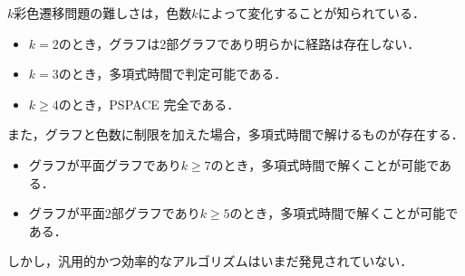 \begin{comment}
  
\begin{figure}[tb]
  \centering
  \begin{subfigure}{0.4\hsize}
    \centering
    
    \caption{$t=0$ (初期状態)}
   \end{subfigure}
   \hspace{1cm}
   \begin{subfigure}{0.4\hsize}
    \centering
    
    \caption{$t=1$}
   \end{subfigure}
   \\
   \vspace{0.5cm}
   \begin{subfigure}{0.4\hsize}
    \centering
    
    \caption{$t=2$}
   \end{subfigure}
   \hspace{1cm}
   \begin{subfigure}{0.4\hsize}
    \centering
    
    \caption{$t=3$ (目標状態)}
   \end{subfigure}

   \caption{遷移系列の例}
   \label{fig:ans_varrecol}
\end{figure}
\end{comment}

$k$彩色遷移問題の難しさは，色数$k$によって変化することが知られている． 
\begin{itemize}
  \item $k = 2$のとき，グラフは2部グラフであり明らかに経路は存在しない． \cite{CHM2011:JGT}
  \item $k = 3$のとき，多項式時間で判定可能である． \cite{CHM2011:JGT}
  \item $k \geq 4$のとき，PSPACE 完全である． \cite{BC2009:tcs}
\end{itemize}
また，グラフと色数に制限を加えた場合，多項式時間で解けるものが存在する． \cite{BC2009:tcs}
\begin{itemize}
  \item グラフが平面グラフであり$k \geq 7$のとき，多項式時間で解くことが可能である．
  \item グラフが平面2部グラフであり$k \geq 5$のとき，多項式時間で解くことが可能である．
\end{itemize}
しかし，汎用的かつ効率的なアルゴリズムはいまだ発見されていない．

